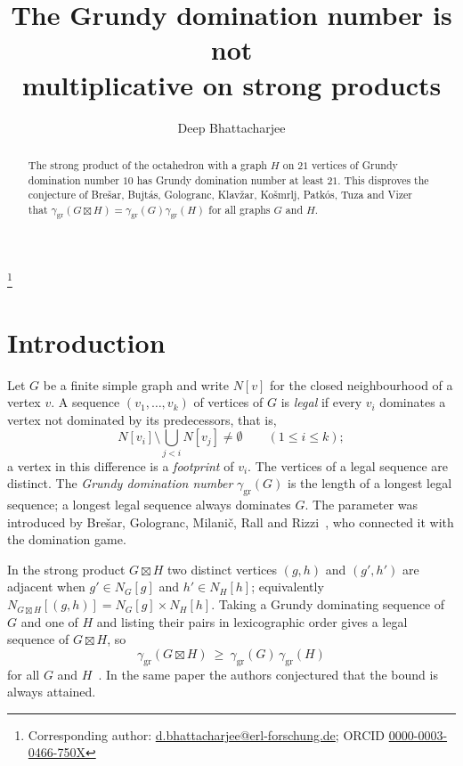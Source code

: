 \documentclass[11pt]{amsart}
\theoremstyle{definition}
\theoremstyle{remark}
\numberwithin{equation}{section}
\newcommand{\ggr}{\gamma_{\mathrm{gr}}}
\newcommand{\sprod}{\boxtimes}
\begin{document}
\title[Grundy domination of strong products]{The Grundy domination number is not\\ multiplicative on strong products}

\author{Deep Bhattacharjee}
\address{Formerly, Electro-Gravitational Space Propulsion Laboratory (EGSPL),\newline Bhubaneswar, Odisha 751030, India}
\thanks{Corresponding author: \href{mailto:d.bhattacharjee@erl-forschung.de}{d.bhattacharjee@erl-forschung.de}; ORCID \href{https://orcid.org/0000-0003-0466-750X}{\mbox{0000-0003-0466-750X}}}


\begin{abstract}
The strong product of the octahedron with a graph $H$ on $21$ vertices of Grundy domination number $10$ has Grundy domination number at least $21$. This disproves the conjecture of Bre\v{s}ar, Bujt\'as, Gologranc, Klav\v{z}ar, Ko\v{s}mrlj, Patk\'os, Tuza and Vizer that $\ggr(G\sprod H)=\ggr(G)\ggr(H)$ for all graphs $G$ and $H$.
\end{abstract}

\maketitle

\section{Introduction}

Let $G$ be a finite simple graph and write $N[v]$ for the closed neighbourhood of a vertex $v$. A sequence $(v_1,\dots,v_k)$ of vertices of $G$ is \emph{legal} if every $v_i$ dominates a vertex not dominated by its predecessors, that is,
\[
  N[v_i]\setminus\bigcup_{j<i}N[v_j]\neq\emptyset\qquad(1\le i\le k);
\]
a vertex in this difference is a \emph{footprint} of $v_i$. The vertices of a legal sequence are distinct. The \emph{Grundy domination number} $\ggr(G)$ is the length of a longest legal sequence; a longest legal sequence always dominates $G$. The parameter was introduced by Bre\v{s}ar, Gologranc, Milani\v{c}, Rall and Rizzi~\cite{BGMRR}, who connected it with the domination game.

In the strong product $G\sprod H$ two distinct vertices $(g,h)$ and $(g',h')$ are adjacent when $g'\in N_G[g]$ and $h'\in N_H[h]$; equivalently $N_{G\sprod H}[(g,h)]=N_G[g]\times N_H[h]$. Taking a Grundy dominating sequence of $G$ and one of $H$ and listing their pairs in lexicographic order gives a legal sequence of $G\sprod H$, so
\begin{equation}\label{eq:lower}
  \ggr(G\sprod H)\ \ge\ \ggr(G)\,\ggr(H)
\end{equation}
for all $G$ and $H$~\cite[Proposition~21]{BBG}. In the same paper the authors conjectured that the bound is always attained.
\end{document}
